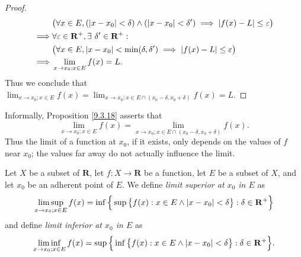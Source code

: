 \begin{proof}
\begin{align*}
                 & \big(\forall x \in E, (\abs*{x - x_0} < \delta) \land (\abs*{x - x_0} < \delta') \implies \abs*{f(x) - L} \leq \varepsilon\big)         \\
        \implies & \forall \varepsilon \in \mathbf{R}^+, \exists\ \delta' \in \mathbf{R}^+ :                                                               \\
                 & \big(\forall x \in E, \abs*{x - x_0} < \min(\delta, \delta') \implies \abs*{f(x) - L} \leq \varepsilon\big)                             \\
        \implies & \lim_{x \to x_0 ; x \in E} f(x) = L.
    \end{align*}
    Thus we conclude that \(\lim_{x \to x_0 ; x \in E} f(x) = \lim_{x \to x_0 ; x \in E \cap (x_0 - \delta, x_0 + \delta)} f(x) = L\).
\end{proof}

\begin{note}
    Informally, Proposition \ref{9.3.18} asserts that
    \[
        \lim_{x \to x_0 ; x \in E} f(x) = \lim_{x \to x_0 ; x \in E \cap (x_0 - \delta, x_0 + \delta)} f(x).
    \]
    Thus the limit of a function at \(x_0\), if it exists, only depends on the values of \(f\) near \(x_0\);
    the values far away do not actually influence the limit.
\end{note}

\begin{additional corollary}\label{ac 9.3.1}
Let \(X\) be a subset of \(\mathbf{R}\), let \(f : X \to \mathbf{R}\) be a function, let \(E\) be a subset of \(X\), and let \(x_0\) be an adherent point of \(E\).
We define \emph{limit superior at \(x_0\) in \(E\)} as
\[
    \limsup_{x \to x_0 ; x \in E} f(x) = \inf\Big\{\sup\big\{f(x) : x \in E \land \abs*{x - x_0} < \delta\big\} : \delta \in \mathbf{R}^+\Big\}
\]
and define \emph{limit inferior at \(x_0\) in \(E\)} as
\[
    \liminf_{x \to x_0 ; x \in E} f(x) = \sup\Big\{\inf\big\{f(x) : x \in E \land \abs*{x - x_0} < \delta\big\} : \delta \in \mathbf{R}^+\Big\}.
\]
\end{additional corollary}

